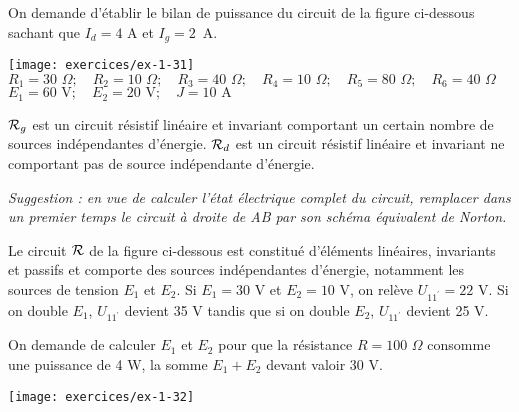 \begin{exercise}{}\label{ex:mg-14}
On demande d'établir le bilan de puissance du circuit
de la  figure ci-dessous sachant que  $I_d=4$ A et $I_g=2$~A.
\begin{center}
\texttt{[image: exercices/ex-1-31]}\\
$R_1=30\,\, \Omega ; \quad R_2=10\,\,  \Omega  
; \quad R_3=40\,\, \Omega ; \quad R_4=10 \,\, \Omega 
; \quad R_5=80  \,\, \Omega  ; \quad R_6=40  \,\, \Omega$\\
$E_1 = 60\mbox{~V}  ; \quad E_2=20\mbox{~V};\quad  J=10  \mbox{~A}$
\end{center}

${\cal R}_g$ est un circuit résistif linéaire et invariant comportant
un certain nombre de sources indépendantes d'énergie. ${\cal R}_d$ est
un circuit résistif linéaire et invariant ne comportant pas de source
indépendante d'énergie.

{\em Suggestion : en vue de calculer l'état électrique complet du
	circuit, remplacer dans un premier temps le circuit à droite de AB
	par son schéma équivalent de Norton.}

\end{exercise}

\begin{exercise}{}\label{ex:mg-15}
Le circuit $\cal R$ de la  figure ci-dessous est constitu\'e d'\'el\'ements
lin\'eaires, invariants et passifs et comporte des sources
ind\'ependantes d'\'energie, notamment les sources de tension $E_1$ et
$E_2$. Si $E_1=30$ V et $E_2=10$ V, on relève $U_{11^{'}}=22$ V. Si on
double $E_1$, $U_{11^{'}}$ devient 35 V tandis que si on double $E_2$,
$U_{11^{'}}$ devient 25 V. 

On demande de calculer $E_1$ et $E_2$ pour que la résistance
$R=100\,\, \Omega$ consomme une puissance de 4 W, la somme $E_1+E_2$
devant valoir 30 V.

\begin{center}
\texttt{[image: exercices/ex-1-32]}
\end{center}

\end{exercise}


